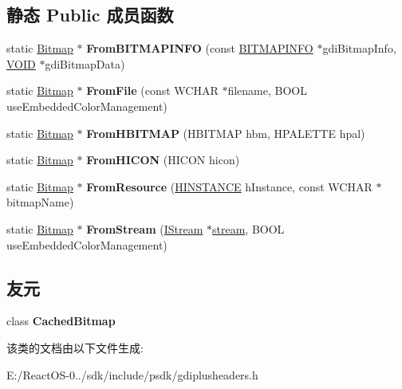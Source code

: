 \subsection*{静态 Public 成员函数}
\begin{DoxyCompactItemize}
\item 
\mbox{\label{class_bitmap_a1333cafb0c8ca96ad22a1168beb4063f}} 
static \hyperlink{class_bitmap}{Bitmap} $\ast$ {\bfseries From\+B\+I\+T\+M\+A\+P\+I\+N\+FO} (const \hyperlink{structtag_b_i_t_m_a_p_i_n_f_o}{B\+I\+T\+M\+A\+P\+I\+N\+FO} $\ast$gdi\+Bitmap\+Info, \hyperlink{interfacevoid}{V\+O\+ID} $\ast$gdi\+Bitmap\+Data)
\item 
\mbox{\label{class_bitmap_afc60c2c649f9f9233d482e7267d91377}} 
static \hyperlink{class_bitmap}{Bitmap} $\ast$ {\bfseries From\+File} (const W\+C\+H\+AR $\ast$filename, B\+O\+OL use\+Embedded\+Color\+Management)
\item 
\mbox{\label{class_bitmap_af4ea1145f556a7615028b61c3b532afe}} 
static \hyperlink{class_bitmap}{Bitmap} $\ast$ {\bfseries From\+H\+B\+I\+T\+M\+AP} (H\+B\+I\+T\+M\+AP hbm, H\+P\+A\+L\+E\+T\+TE hpal)
\item 
\mbox{\label{class_bitmap_abf7a93d8c7c06f6d5b5c78d61d87d964}} 
static \hyperlink{class_bitmap}{Bitmap} $\ast$ {\bfseries From\+H\+I\+C\+ON} (H\+I\+C\+ON hicon)
\item 
\mbox{\label{class_bitmap_a47a08987b0b529b3fd5550407ab85c4f}} 
static \hyperlink{class_bitmap}{Bitmap} $\ast$ {\bfseries From\+Resource} (\hyperlink{interfacevoid}{H\+I\+N\+S\+T\+A\+N\+CE} h\+Instance, const W\+C\+H\+AR $\ast$bitmap\+Name)
\item 
\mbox{\label{class_bitmap_a10dd32be3ed7635c3b713ff258b01a4c}} 
static \hyperlink{class_bitmap}{Bitmap} $\ast$ {\bfseries From\+Stream} (\hyperlink{interface_i_stream}{I\+Stream} $\ast$\hyperlink{structstream}{stream}, B\+O\+OL use\+Embedded\+Color\+Management)
\end{DoxyCompactItemize}
\subsection*{友元}
\begin{DoxyCompactItemize}
\item 
\mbox{\label{class_bitmap_aaa35f40f41b165fc13608e0c2e636f87}} 
class {\bfseries Cached\+Bitmap}
\end{DoxyCompactItemize}


该类的文档由以下文件生成\+:\begin{DoxyCompactItemize}
\item 
E\+:/\+React\+O\+S-\/0../sdk/include/psdk/gdiplusheaders.\+h\end{DoxyCompactItemize}
